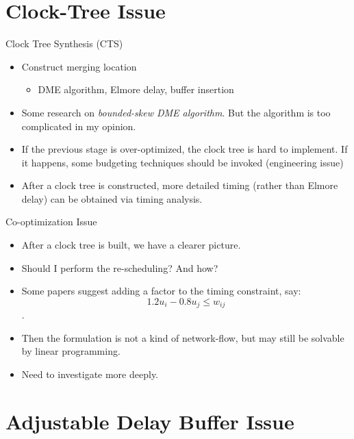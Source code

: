 \documentclass[
  ignorenonframetext,
]{beamer}
\providecommand{\tightlist}{%
  \setlength{\itemsep}{0pt}\setlength{\parskip}{0pt}}
\begin{document}
\hypertarget{clock-tree-issue}{%
\section{Clock-Tree Issue}\label{clock-tree-issue}}

\begin{frame}{Clock Tree Synthesis (CTS)}
\protect\hypertarget{clock-tree-synthesis-cts}{}
\begin{itemize}
\tightlist
\item
  Construct merging location

  \begin{itemize}
  \tightlist
  \item
    DME algorithm, Elmore delay, buffer insertion
  \end{itemize}
\item
  Some research on \emph{bounded-skew DME algorithm}. But the algorithm
  is too complicated in my opinion.
\item
  If the previous stage is over-optimized, the clock tree is hard to
  implement. If it happens, some budgeting techniques should be invoked
  (engineering issue)
\item
  After a clock tree is constructed, more detailed timing (rather than
  Elmore delay) can be obtained via timing analysis.
\end{itemize}
\end{frame}

\begin{frame}{Co-optimization Issue}
\protect\hypertarget{co-optimization-issue}{}
\begin{itemize}
\tightlist
\item
  After a clock tree is built, we have a clearer picture.
\item
  Should I perform the re-scheduling? And how?
\item
  Some papers suggest adding a factor to the timing constraint, say:
  \[1.2 u_i - 0.8 u_j \leq w_{ij}\].
\item
  Then the formulation is not a kind of network-flow, but may still be
  solvable by linear programming.
\item
  Need to investigate more deeply.
\end{itemize}
\end{frame}

\begin{frame}
\end{frame}

\hypertarget{adjustable-delay-buffer-issue}{%
\section{Adjustable Delay Buffer
Issue}\label{adjustable-delay-buffer-issue}}
\end{document}
